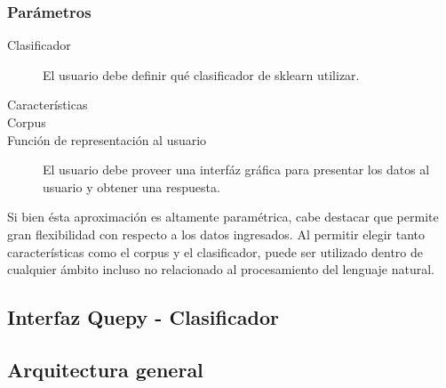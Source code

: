 \subsubsection{Parámetros}
\begin{description}
	\item[Clasificador] El usuario debe definir qué clasificador de sklearn utilizar.
	\item[Características]
	\item[Corpus]
	\item[Función de representación al usuario] El usuario debe proveer una interfáz gráfica para presentar los datos al usuario y obtener una respuesta.
\end{description}
Si bien ésta aproximación es altamente paramétrica, cabe destacar que permite gran flexibilidad con respecto a los datos ingresados. Al permitir elegir tanto características como el corpus y el clasificador, puede ser utilizado dentro de cualquier ámbito incluso no relacionado al procesamiento del lenguaje natural.

\subsection{Interfaz Quepy - Clasificador}

\subsection{Arquitectura general}
